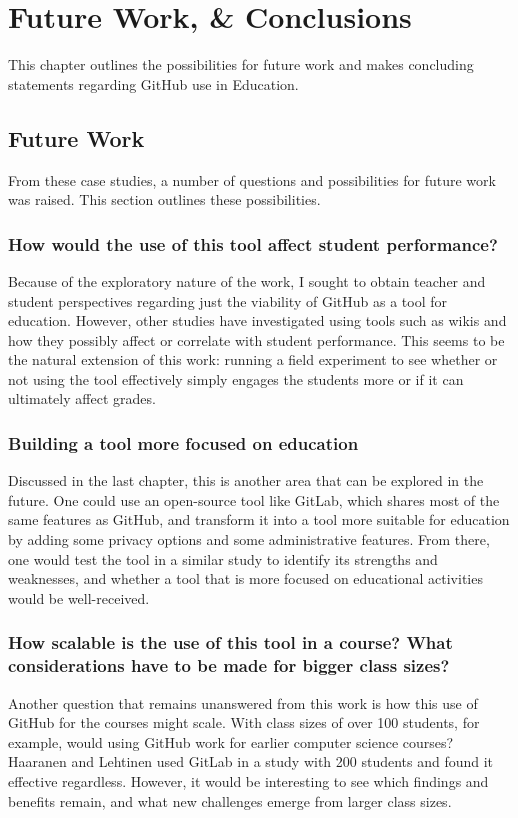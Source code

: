 \chapter{Future Work, \& Conclusions}

This chapter outlines the possibilities for future work and makes concluding statements regarding GitHub use in Education.

\section{Future Work}
From these case studies, a number of questions and possibilities for future work was raised. This section outlines these possibilities.

\subsection{How would the use of this tool affect student performance?}
Because of the exploratory nature of the work, I sought to obtain teacher and student perspectives regarding just the viability of GitHub as a tool for education. However, other studies have investigated using tools such as wikis \cite{minocha2007collaborative} and how they possibly affect or correlate with student performance. This seems to be the natural extension of this work: running a field experiment to see whether or not using the tool effectively simply engages the students more or if it can ultimately affect grades.

\subsection{Building a tool more focused on education}
Discussed in the last chapter, this is another area that can be explored in the future. One could use an open-source tool like GitLab, which shares most of the same features as GitHub, and transform it into a tool more suitable for education by adding some privacy options and some administrative features. From there, one would test the tool in a similar study to identify its strengths and weaknesses, and whether a tool that is more focused on educational activities would be well-received.

\subsection{How scalable is the use of this tool in a course? What considerations have to be made for bigger class sizes?}
Another question that remains unanswered from this work is how this use of GitHub for the courses might scale. With class sizes of over 100 students, for example, would using GitHub work for earlier computer science courses? Haaranen and Lehtinen \cite{haaranen2015teaching} used GitLab in a study with 200 students and found it effective regardless. However, it would be interesting to see which findings and benefits remain, and what new challenges emerge from larger class sizes.

